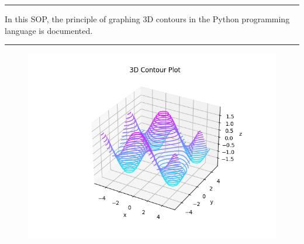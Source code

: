 \documentclass[
11pt, %
a4paper, %
oneside, %
headinclude,footinclude, %
BCOR5mm, %
]{scrartcl}
\renewenvironment{abstract}
 {\quotation\small\noindent\rule{\linewidth}{.5pt}\par\smallskip
  {\centering\bfseries\abstractname\par}\medskip}
 {\par\noindent\rule{\linewidth}{.5pt}\endquotation}
\begin{document}
\begin{abstract}\centering\noindent %
In this SOP, the principle of graphing 3D contours in the Python programming language is documented.
\end{abstract}
\vspace*{0.15in}
\begin{figure}
\centering %
\includegraphics[width=0.6\columnwidth]{Figures/Figure0.png} %
\end{figure}

\makeatletter
{} %
\makeatother

\setcounter{tocdepth}{2} %

\pagebreak
\tableofcontents %
\listoffigures %


\end{document}
